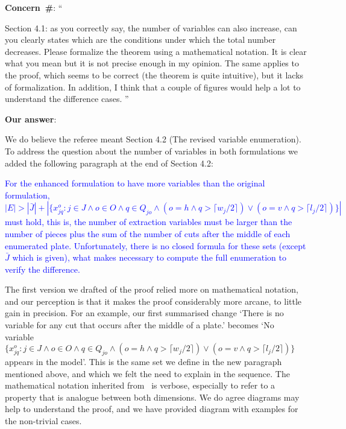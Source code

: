 \documentclass[smallextended]{svjour3}       %
\makeatletter
\newif\iffinalversion
\newcommand{\newtext}[1]{\iffinalversion%
#1%
\else%
\textcolor{blue}{#1}%
\fi%
}
\newcommand\gobblepars{%
    \@ifnextchar\par%
        {\expandafter\gobblepars\@gobble}%
        {}}
\newcounter{concern}
\newenvironment{concern}{%
    \refstepcounter{concern}\par\smallskip\noindent%
    \textbf{Concern~\#\theconcern}: ``\itshape\gobblepars}%
    {\unskip''\smallskip}
\newcounter{answer}
\newenvironment{answer}{%
    \refstepcounter{answer}\par\smallskip\noindent%
    \textbf{Our answer}: \gobblepars}%
    {\unskip\bigskip}
\makeatother
\begin{document}
\begin{concern}
Section 4.1: as you correctly say, the number of variables can also increase, can you clearly states which are the conditions under which the total number decreases. Please formalize the theorem using a mathematical notation. It is clear what you mean but it is not precise enough in my opinion. The same applies to the proof, which seems to be correct (the theorem is quite intuitive), but it lacks of formalization. In addition, I think that a couple of figures would help a lot to understand the difference cases.
\end{concern}
\begin{answer}
We do believe the referee meant Section 4.2 (The revised variable enumeration).
To address the question about the number of variables in both formulations we added the following paragraph at the end of Section 4.2:

\newtext{For the enhanced formulation to have more variables than the original formulation, \(|E| > |\bar{J}| + |\{x^o_{jq} : j \in J \land o \in O \land q \in Q_{jo} \land (o = h \land q > \lceil w_j / 2 \rceil) \lor (o = v \land q > \lceil l_j / 2 \rceil)\}|\) must hold, this is, the number of extraction variables must be larger than the number of pieces plus the sum of the number of cuts after the middle of each enumerated plate. Unfortunately, there is no closed formula for these sets (except \(\bar{J}\) which is given), what makes necessary to compute the full enumeration to verify the difference.}

The first version we drafted of the proof relied more on mathematical notation, and our perception is that it makes the proof considerably more arcane, to little gain in precision.
For an example, our first summarised change `There is no variable for any cut that occurs after the middle of a plate.' becomes `No variable~\(\{x^o_{jq} : j \in J \land o \in O \land q \in Q_{jo} \land (o = h \land q > \lceil w_j / 2 \rceil) \lor (o = v \land q > \lceil l_j / 2 \rceil)\}\) appears in the model'. This is the same set we define in the new paragraph mentioned above, and which we felt the need to explain in the sequence.
The mathematical notation inherited from~\cite{furini:2016} is verbose, especially to refer to a property that is analogue between both dimensions.
We do agree diagrams may help to understand the proof, and we have provided diagram with examples for the non-trivial cases.

\begin{figure}
\end{figure}
\end{answer}
\end{document}
